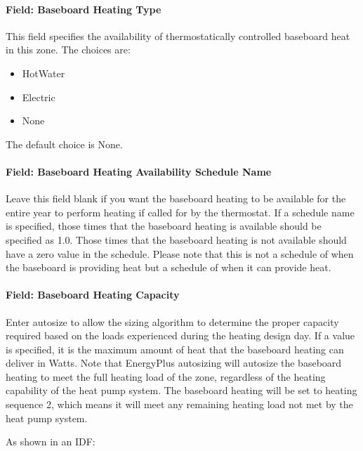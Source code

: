\paragraph{Field: Baseboard Heating Type}\label{field-baseboard-heating-type-4}

This field specifies the availability of thermostatically controlled baseboard heat in this zone. The choices are:

\begin{itemize}
\item
  HotWater
\item
  Electric
\item
  None
\end{itemize}

The default choice is None.

\paragraph{Field: Baseboard Heating Availability Schedule Name}\label{field-baseboard-heating-availability-schedule-name-4}

Leave this field blank if you want the baseboard heating to be available for the entire year to perform heating if called for by the thermostat. If a schedule name is specified, those times that the baseboard heating is available should be specified as 1.0. Those times that the baseboard heating is not available should have a zero value in the schedule. Please note that this is not a schedule of when the baseboard is providing heat but a schedule of when it can provide heat.

\paragraph{Field: Baseboard Heating Capacity}\label{field-baseboard-heating-capacity-4}

Enter autosize to allow the sizing algorithm to determine the proper capacity required based on the loads experienced during the heating design day. If a value is specified, it is the maximum amount of heat that the baseboard heating can deliver in Watts. Note that EnergyPlus autosizing will autosize the baseboard heating to meet the full heating load of the zone, regardless of the heating capability of the heat pump system. The baseboard heating will be set to heating sequence 2, which means it will meet any remaining heating load not met by the heat pump system.

As shown in an IDF:


